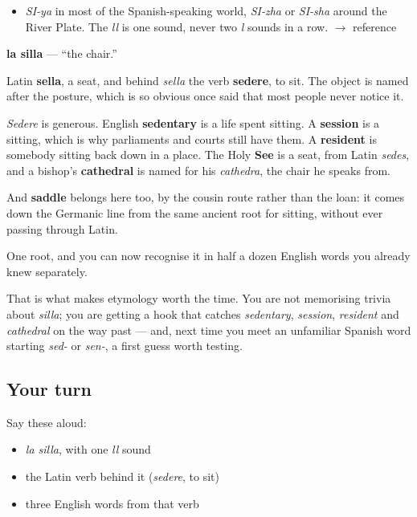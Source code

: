 \begin{sounds}
\begin{itemize}
\raggedright
  \item \emph{SI-ya} in most of the Spanish-speaking world, \emph{SI-zha} or \emph{SI-sha} around the River Plate. The \emph{ll} is one sound, never two \emph{l} sounds in a row. $\to$ reference
\end{itemize}
\end{sounds}

\begin{cousinweb}
\textbf{la silla} — \textquotedblleft{}the chair.\textquotedblright{}

Latin \textbf{sella}, a seat, and behind \emph{sella} the verb \textbf{sedere}, to sit. The object is named after the posture, which is so obvious once said that most people never notice it.

\emph{Sedere} is generous. English \textbf{sedentary} is a life spent sitting. A \textbf{session} is a sitting, which is why parliaments and courts still have them. A \textbf{resident} is somebody sitting back down in a place. The Holy \textbf{See} is a seat, from Latin \emph{sedes}, and a bishop's \textbf{cathedral} is named for his \emph{cathedra}, the chair he speaks from.

And \textbf{saddle} belongs here too, by the cousin route rather than the loan: it comes down the Germanic line from the same ancient root for sitting, without ever passing through Latin.
\end{cousinweb}

\begin{grammarlens}[title={What you've built}]
One root, and you can now recognise it in half a dozen English words you already knew separately.

That is what makes etymology worth the time. You are not memorising trivia about \emph{silla}; you are getting a hook that catches \emph{sedentary}, \emph{session}, \emph{resident} and \emph{cathedral} on the way past — and, next time you meet an unfamiliar Spanish word starting \emph{sed-} or \emph{sen-}, a first guess worth testing.
\end{grammarlens}

\subsection*{Your turn}
Say these aloud:

\begin{itemize}
\raggedright
  \item \emph{la silla}, with one \emph{ll} sound
  \item the Latin verb behind it (\emph{sedere}, to sit)
  \item three English words from that verb
\end{itemize}

